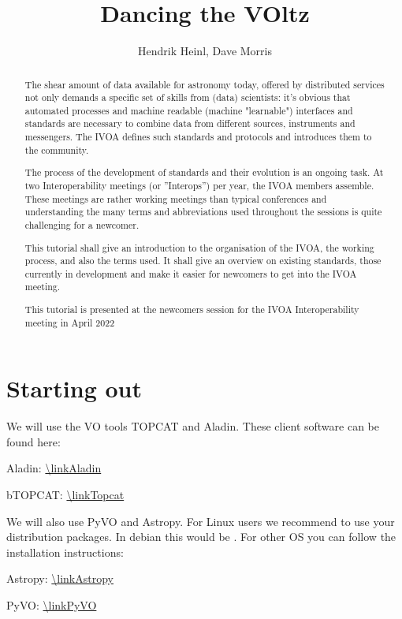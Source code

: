 \documentclass[twoside]{article}[12pt]
\title {Dancing the VOltz}
\author {Hendrik Heinl, Dave Morris}
\begin{document}
\maketitle  
 
\pagebreak
\begin {abstract}
The shear amount of data available for astronomy today, offered by
distributed services not only demands a specific set of skills from
(data) scientists: it's obvious that automated processes and machine
readable (machine "learnable") interfaces and standards are necessary to
combine data from different sources, instruments and messengers. The
IVOA defines such standards and protocols and introduces them to the
community. 

The process of the development of standards and their evolution is an
ongoing task. At two Interoperability meetings (or ''Interops'') per
year, the IVOA members assemble. These meetings are rather working
meetings than typical conferences and understanding the many terms and
abbreviations used throughout the sessions is quite challenging for a
newcomer.  

This tutorial shall give an introduction to the organisation of the
IVOA, the working process, and also the terms used. It shall give an
overview on existing standards, those currently in development and make
it easier for newcomers to get into the IVOA meeting.

This tutorial is presented at the newcomers session for the IVOA
Interoperability meeting in April 2022\end{abstract}



\section{Starting out}
We will use the VO tools TOPCAT and Aladin. These client
software can be found here:

Aladin: \url{\linkAladin}

bTOPCAT: \url{\linkTopcat}

We will also use PyVO and Astropy. For Linux users we recommend to use
your distribution packages. In debian this would be 
. For other OS you can
follow the installation instructions:

Astropy: \url{\linkAstropy}

PyVO: \url{\linkPyVO}
\end{document}
